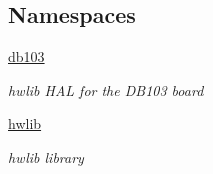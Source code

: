 \subsection*{Namespaces}
\begin{DoxyCompactItemize}
\item 
 \hyperlink{namespacedb103}{db103}
\begin{DoxyCompactList}\small\item\em hwlib H\+AL for the D\+B103 board \end{DoxyCompactList}\item 
 \hyperlink{namespacehwlib}{hwlib}
\begin{DoxyCompactList}\small\item\em hwlib library \end{DoxyCompactList}\end{DoxyCompactItemize}

